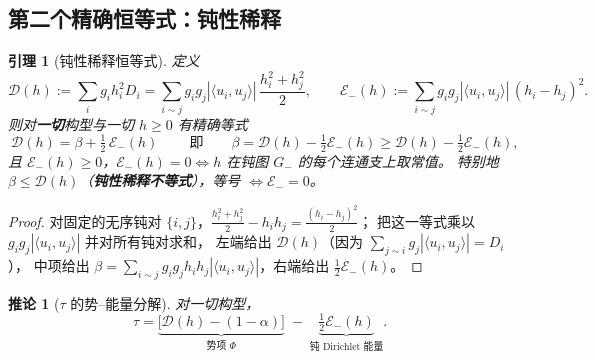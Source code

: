 \documentclass[UTF8,11pt]{ctexart}
\newtheorem{lemma}[theorem]{引理}
\newtheorem{corollary}[theorem]{推论}
\theoremstyle{definition}
\begin{document}
\subsection{第二个精确恒等式：钝性稀释}\label{sec:r18:dil}

\begin{lemma}[钝性稀释恒等式]\label{lem:dilution}
定义
\begin{equation}\label{eq:Dhdef}
\mathcal D(h):=\sum_ig_ih_i^2D_i=\sum_{i\sim j}g_ig_j|\langle u_i,u_j\rangle|\,\frac{h_i^2+h_j^2}{2},
\qquad
\mathcal E_-(h):=\sum_{i\sim j}g_ig_j|\langle u_i,u_j\rangle|\,(h_i-h_j)^2 .
\end{equation}
则对\textbf{一切}构型与一切 $h\ge0$ 有精确等式
\begin{equation}\label{eq:dilution}
\boxed{\ \mathcal D(h)=\beta+\tfrac12\,\mathcal E_-(h)\ }\qquad\text{即}\qquad
\beta=\mathcal D(h)-\tfrac12\mathcal E_-(h)\ge \mathcal D(h)-\tfrac12\mathcal E_-(h),
\end{equation}
且 $\mathcal E_-(h)\ge0$，$\mathcal E_-(h)=0\Leftrightarrow h$ 在钝图 $G_-$ 的每个连通支上取常值。
特别地 $\beta\le\mathcal D(h)$（\textbf{钝性稀释不等式}），等号 $\Leftrightarrow\mathcal E_-=0$。
\end{lemma}

\begin{proof}
对固定的无序钝对 $\{i,j\}$，$\frac{h_i^2+h_j^2}2-h_ih_j=\frac{(h_i-h_j)^2}2$；
把这一等式乘以 $g_ig_j|\langle u_i,u_j\rangle|$ 并对所有钝对求和，
左端给出 $\mathcal D(h)$（因为 $\sum_{j\sim i}g_j|\langle u_i,u_j\rangle|=D_i$），
中项给出 $\beta=\sum_{i\sim j}g_ig_jh_ih_j|\langle u_i,u_j\rangle|$，右端给出 $\frac12\mathcal E_-(h)$。
\end{proof}

\begin{corollary}[$\tau$ 的势--能量分解]\label{cor:tauenergy}
对一切构型，
\begin{equation}\label{eq:tauenergy}
\tau=\underbrace{\bigl[\mathcal D(h)-(1-\alpha)\bigr]}_{\text{势项 }\Phi}
\;-\;\underbrace{\tfrac12\mathcal E_-(h)}_{\text{钝 Dirichlet 能量}} .
\end{equation}
\end{corollary}
\end{document}
